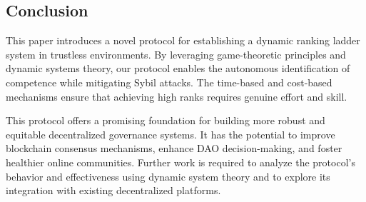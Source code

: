 \documentclass{article}
\begin{document}
\begin{CJK}{UTF8}{gbsn}
    \section{Conclusion}

    This paper introduces a novel protocol for establishing a dynamic ranking ladder system in trustless environments. By leveraging game-theoretic principles and dynamic systems theory, our protocol enables the autonomous identification of competence while mitigating Sybil attacks. The time-based and cost-based mechanisms ensure that achieving high ranks requires genuine effort and skill.

    This protocol offers a promising foundation for building more robust and equitable decentralized governance systems. It has the potential to improve blockchain consensus mechanisms, enhance DAO decision-making, and foster healthier online communities. Further work is required to analyze the protocol's behavior and effectiveness using dynamic system theory and to explore its integration with existing decentralized platforms.


    \clearpage

    
    

    \clearpage\end{CJK}
\end{document}
